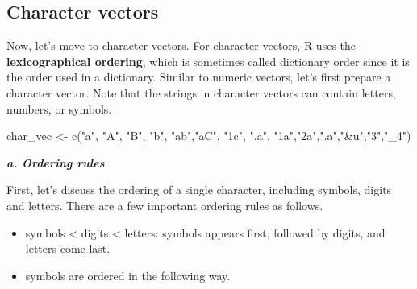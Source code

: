 \documentclass[
]{book}
\newenvironment{Shaded}{\begin{snugshade}}{\end{snugshade}}
\newcommand{\FunctionTok}[1]{\textcolor[rgb]{0.00,0.00,0.00}{#1}}
\newcommand{\NormalTok}[1]{#1}
\newcommand{\OtherTok}[1]{\textcolor[rgb]{0.56,0.35,0.01}{#1}}
\newcommand{\StringTok}[1]{\textcolor[rgb]{0.31,0.60,0.02}{#1}}
\providecommand{\tightlist}{%
  \setlength{\itemsep}{0pt}\setlength{\parskip}{0pt}}
\begin{document}
\hypertarget{character-vectors}{%
\subsection{Character vectors}\label{character-vectors}}

Now, let's move to character vectors. For character vectors, R uses the \textbf{lexicographical ordering}, which is sometimes called dictionary order since it is the order used in a dictionary. Similar to numeric vectors, let's first prepare a character vector. Note that the strings in character vectors can contain letters, numbers, or symbols.

\begin{Shaded}
\begin{Highlighting}[]
\NormalTok{char\_vec }\OtherTok{\textless{}{-}} \FunctionTok{c}\NormalTok{(}\StringTok{"a"}\NormalTok{, }\StringTok{"A"}\NormalTok{, }\StringTok{"B"}\NormalTok{, }\StringTok{"b"}\NormalTok{, }\StringTok{"ab"}\NormalTok{,}\StringTok{"aC"}\NormalTok{, }\StringTok{"1c"}\NormalTok{, }\StringTok{".a"}\NormalTok{, }\StringTok{"1a"}\NormalTok{,}\StringTok{"2a"}\NormalTok{,}\StringTok{".a"}\NormalTok{,}\StringTok{"\&u"}\NormalTok{,}\StringTok{"3"}\NormalTok{,}\StringTok{"\_4"}\NormalTok{)}
\end{Highlighting}
\end{Shaded}

\textbf{\emph{a. Ordering rules}}

First, let's discuss the ordering of a single character, including symbols, digits and letters.
There are a few important ordering rules as follows.

\begin{itemize}
\tightlist
\item
  symbols \textless{} digits \textless{} letters: symbols appears first, followed by digits, and letters come last.
\item
  symbols are ordered in the following way.
\end{itemize}

\begin{Shaded}
\end{Shaded}
\end{document}
